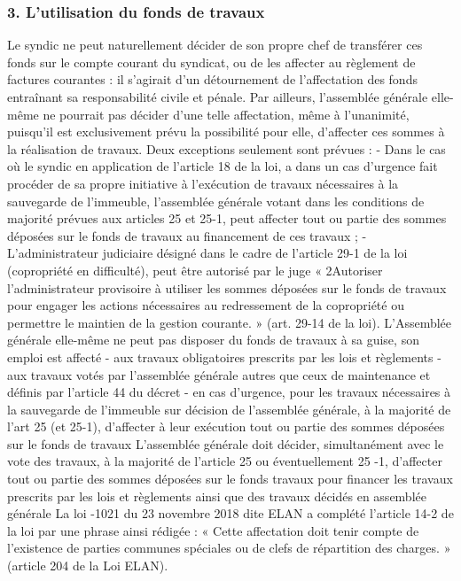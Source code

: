 		\subsubsection{3. L’utilisation du fonds de travaux}
		
			Le syndic ne peut naturellement décider de son propre chef de transférer ces fonds sur le compte courant du syndicat, ou de les affecter au règlement de factures courantes : il s’agirait d’un détournement de l’affectation des fonds entraînant sa responsabilité civile et pénale. Par ailleurs, l’assemblée générale elle-même ne pourrait pas décider d’une telle affectation, même à l’unanimité, puisqu’il est exclusivement prévu la possibilité pour elle, d’affecter ces sommes à la réalisation de travaux.
			Deux exceptions seulement sont prévues :
			- Dans le cas où le syndic en application de l’article 18 de la loi, a dans un cas d’urgence fait procéder de sa propre initiative à l’exécution de travaux nécessaires à la sauvegarde de l’immeuble, l’assemblée générale votant dans les conditions de majorité prévues aux articles 25 et 25-1, peut affecter tout ou partie des sommes déposées sur le fonds de travaux au financement de ces travaux ;
			- L’administrateur judiciaire désigné dans le cadre de l’article 29-1 de la loi (copropriété en difficulté), peut être autorisé par le juge « 2\degres Autoriser l’administrateur provisoire à utiliser les sommes déposées sur le fonds de travaux pour engager les actions nécessaires au redressement de la copropriété ou permettre le maintien de la gestion courante. » (art. 29-14 de la loi).
			L’Assemblée générale elle-même ne peut pas disposer du fonds de travaux à sa guise, son emploi est affecté
			- aux travaux obligatoires prescrits par les lois et règlements
			- aux travaux votés par l’assemblée générale autres que ceux de maintenance et définis par l’article 44 du décret
			- en cas d’urgence, pour les travaux nécessaires à la sauvegarde de l’immeuble sur décision de l’assemblée générale, à la majorité de l’art 25 (et 25-1), d’affecter à leur exécution tout ou partie des sommes déposées sur le fonds de travaux
			L’assemblée générale doit décider, simultanément avec le vote des travaux, à la majorité de l’article 25 ou éventuellement 25 -1, d’affecter tout ou partie des sommes déposées sur le fonds travaux pour financer les travaux prescrits par les lois et règlements ainsi que des travaux décidés en assemblée générale
			La loi -1021 du 23 novembre 2018 dite ELAN a complété l’article 14-2 de la loi par une phrase ainsi rédigée : « Cette affectation doit tenir compte de l’existence de parties communes spéciales ou de clefs de répartition des charges. » (article 204 de la Loi ELAN).
